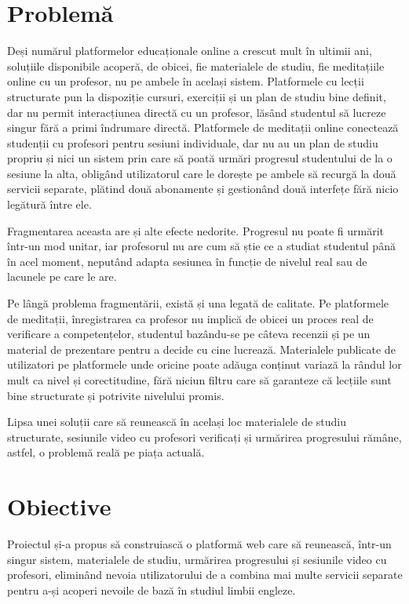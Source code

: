 \section{Problemă}
Deși numărul platformelor educaționale online a crescut mult în ultimii ani, soluțiile disponibile acoperă, de obicei, fie materialele de studiu, fie meditațiile online cu un profesor, nu pe ambele în același sistem. Platformele cu lecții structurate pun la dispoziție cursuri, exerciții și un plan de studiu bine definit, dar nu permit interacțiunea directă cu un profesor, lăsând studentul să lucreze singur fără a primi îndrumare directă. Platformele de meditații online conectează studenții cu profesori pentru sesiuni individuale, dar nu au un plan de studiu propriu și nici un sistem prin care să poată urmări progresul studentului de la o sesiune la alta, obligând utilizatorul care le dorește pe ambele să recurgă la două servicii separate, plătind două abonamente și gestionând două interfețe fără nicio legătură între ele.

Fragmentarea aceasta are și alte efecte nedorite. Progresul nu poate fi urmărit într-un mod unitar, iar profesorul nu are cum să știe ce a studiat studentul până în acel moment, neputând adapta sesiunea în funcție de nivelul real sau de lacunele pe care le are.

Pe lângă problema fragmentării, există și una legată de calitate. Pe platformele de meditații, înregistrarea ca profesor nu implică de obicei un proces real de verificare a competențelor, studentul bazându-se pe câteva recenzii și pe un material de prezentare pentru a decide cu cine lucrează. Materialele publicate de utilizatori pe platformele unde oricine poate adăuga conținut variază la rândul lor mult ca nivel și corectitudine, fără niciun filtru care să garanteze că lecțiile sunt bine structurate și potrivite nivelului promis.

Lipsa unei soluții care să reunească în același loc materialele de studiu structurate, sesiunile video cu profesori verificați și urmărirea progresului rămâne, astfel, o problemă reală pe piața actuală.

\section{Obiective}
Proiectul și-a propus să construiască o platformă web care să reunească, într-un singur sistem, materialele de studiu, urmărirea progresului și sesiunile video cu profesori, eliminând nevoia utilizatorului de a combina mai multe servicii separate pentru a-și acoperi nevoile de bază în studiul limbii engleze.

